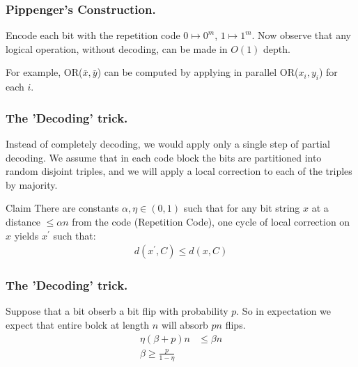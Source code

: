 \documentclass{beamer}
\begin{document}
\begin{frame}
  \frametitle{Pippenger's Construction.} 
  
Encode each bit with the repetition code $0 \mapsto 0^{m}$, $1 \mapsto 1^{m}$. Now observe that any logical operation, without decoding, can be made in $O(1)$ depth.

For example, OR($\bar{x}, \bar{y}$) can be computed by applying in parallel OR($x_{i}, y_{i}$) for each $i$.

\end{frame}


\begin{frame}
  \frametitle{The 'Decoding' trick.} 

Instead of completely decoding, we would apply only a single step of partial decoding. We assume that in each code block the bits are partitioned into random disjoint triples, and we will apply a local correction to each of the triples by majority.



\begin{block}{Claim}
There are constants $\alpha, \eta \in (0,1)$ such that for any bit string $x$ at a distance $\le \alpha n$ from the code (Repetition Code), one cycle of local correction on $x$ yields $x^\prime$ such that:
  \begin{equation*}
    \begin{split}
      d(x^{\prime}, C) \le d(x, C)
    \end{split}
  \end{equation*}
\end{block}
\end{frame}


\begin{frame}
  \frametitle{The 'Decoding' trick.} 
  
  Suppose that a bit obserb a bit flip with probability $p$. So in expectation we expect that entire bolck at length $n$ will absorb $pn$ flips.  
  \begin{equation*}
    \begin{split}
      \eta \left( \beta + p  \right) n &\le \beta n \\ 
      \beta \ge \frac{p}{ 1 - \eta}
    \end{split}
  \end{equation*}


\end{frame}
\end{document}
